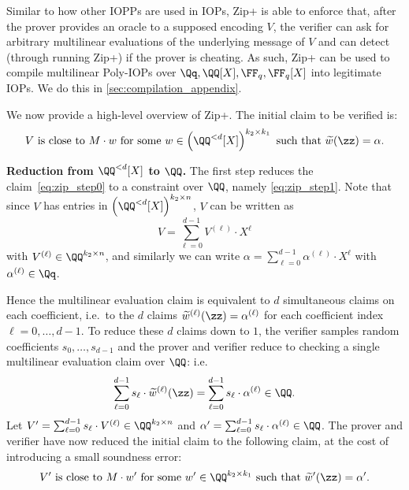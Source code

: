 Similar to how other IOPPs are used in IOPs, Zip+ is able to enforce that, after the prover provides an oracle to a supposed encoding $V$, the verifier can ask for arbitrary multilinear evaluations of the underlying message of $V$ and can detect (through running Zip+) if the prover is cheating. As such, Zip+ can be used to compile multilinear Poly-IOPs over $\Qq, \QQ[X], \FF_q, \FF_q[X]$ into legitimate IOPs.  We do this in \cref{sec:compilation_appendix}. 

\medskip 
We now provide a high-level overview of Zip+. The initial claim to be verified is:
\begin{equation}\label{eq:zip_step0}
  V \text{ is close to } M \cdot w \text{ for some } w \in \left(\QQ^{<d}[X]\right)^{k_2 \times k_1} \text{ such that } \widetilde{w}(\zz) = \alpha.
\end{equation}

\noindent\textbf{Reduction from $\QQ^{<d}[X]$ to $\QQ$.}
The first step reduces the claim~\eqref{eq:zip_step0} to a constraint over $\QQ$, namely \eqref{eq:zip_step1}. Note that since $V$ has entries in $\left(\QQ^{<d}[X]\right)^{k_2 \times n}$, $V$ can be written as $$V=\sum_{\ell=0}^{d-1} V^{(\ell)} \cdot X^\ell$$ with $V^{(\ell)} \in \QQ^{k_2\times n}$, and similarly we can write $\alpha = \sum_{\ell=0}^{d-1} \alpha^{(\ell)} \cdot X^\ell$ with $\alpha^{(\ell)} \in \Qq$.

Hence the multilinear evaluation claim is equivalent to $d$ simultaneous claims on each coefficient, i.e.\ to the $d$ claims $\widetilde{w}^{(\ell)}(\zz) = \alpha^{(\ell)}$ for each coefficient index $\ell=0, \ldots, d-1$. To reduce these $d$ claims down to $1$, the verifier samples random coefficients $s_0, \ldots, s_{d-1}$ and the prover and verifier reduce to checking a single multilinear evaluation claim over $\QQ$: i.e.\ $$\sum_{\ell=0}^{d-1} s_\ell \cdot \widetilde{w}^{(\ell)}(\zz) = \sum_{\ell=0}^{d-1} s_\ell \cdot \alpha^{(\ell)} \in \QQ.$$
Let $V' = \sum_{\ell=0}^{d-1} s_\ell \cdot V^{(\ell)} \in \QQ^{k_2\times n}$ and $\alpha' = \sum_{\ell=0}^{d-1} s_\ell \cdot \alpha^{(\ell)}\in \QQ$. The prover and verifier have now reduced the initial claim to the following claim, at the cost of introducing a small soundness error:
\begin{equation}\label{eq:zip_step1}
  V' \text{ is close to } M \cdot w' \text{ for some } w'\in \QQ^{k_2\times k_1} \text{ such that } \widetilde{w}'(\zz) = \alpha'.
\end{equation}


